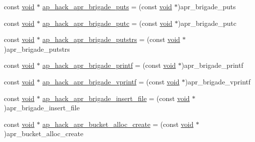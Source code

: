 \begin{DoxyCompactItemize}
\item 
const \hyperlink{group__MOD__ISAPI_gacd6cdbf73df3d9eed42fa493d9b621a6}{void} $\ast$ \hyperlink{srclib_2apr-util_2exports_8c_a33dc77f706d21a38c2c9c786d3b1bf6b}{ap\+\_\+hack\+\_\+apr\+\_\+brigade\+\_\+puts} = (const \hyperlink{group__MOD__ISAPI_gacd6cdbf73df3d9eed42fa493d9b621a6}{void} $\ast$)apr\+\_\+brigade\+\_\+puts
\item 
const \hyperlink{group__MOD__ISAPI_gacd6cdbf73df3d9eed42fa493d9b621a6}{void} $\ast$ \hyperlink{srclib_2apr-util_2exports_8c_aba1f7cddf3571811583877923c597265}{ap\+\_\+hack\+\_\+apr\+\_\+brigade\+\_\+putc} = (const \hyperlink{group__MOD__ISAPI_gacd6cdbf73df3d9eed42fa493d9b621a6}{void} $\ast$)apr\+\_\+brigade\+\_\+putc
\item 
const \hyperlink{group__MOD__ISAPI_gacd6cdbf73df3d9eed42fa493d9b621a6}{void} $\ast$ \hyperlink{srclib_2apr-util_2exports_8c_a75e5c3d2c6f4a1dfde61389d0a624201}{ap\+\_\+hack\+\_\+apr\+\_\+brigade\+\_\+putstrs} = (const \hyperlink{group__MOD__ISAPI_gacd6cdbf73df3d9eed42fa493d9b621a6}{void} $\ast$)apr\+\_\+brigade\+\_\+putstrs
\item 
const \hyperlink{group__MOD__ISAPI_gacd6cdbf73df3d9eed42fa493d9b621a6}{void} $\ast$ \hyperlink{srclib_2apr-util_2exports_8c_a5fa46f7a7ef83e36a7249d8007146868}{ap\+\_\+hack\+\_\+apr\+\_\+brigade\+\_\+printf} = (const \hyperlink{group__MOD__ISAPI_gacd6cdbf73df3d9eed42fa493d9b621a6}{void} $\ast$)apr\+\_\+brigade\+\_\+printf
\item 
const \hyperlink{group__MOD__ISAPI_gacd6cdbf73df3d9eed42fa493d9b621a6}{void} $\ast$ \hyperlink{srclib_2apr-util_2exports_8c_a115b8d58028ab5b987619fbf778f7310}{ap\+\_\+hack\+\_\+apr\+\_\+brigade\+\_\+vprintf} = (const \hyperlink{group__MOD__ISAPI_gacd6cdbf73df3d9eed42fa493d9b621a6}{void} $\ast$)apr\+\_\+brigade\+\_\+vprintf
\item 
const \hyperlink{group__MOD__ISAPI_gacd6cdbf73df3d9eed42fa493d9b621a6}{void} $\ast$ \hyperlink{srclib_2apr-util_2exports_8c_a53b00f27c4f8c38d2fe8becc243737e8}{ap\+\_\+hack\+\_\+apr\+\_\+brigade\+\_\+insert\+\_\+file} = (const \hyperlink{group__MOD__ISAPI_gacd6cdbf73df3d9eed42fa493d9b621a6}{void} $\ast$)apr\+\_\+brigade\+\_\+insert\+\_\+file
\item 
const \hyperlink{group__MOD__ISAPI_gacd6cdbf73df3d9eed42fa493d9b621a6}{void} $\ast$ \hyperlink{srclib_2apr-util_2exports_8c_abe96ed20ce1a7340312984e08325dad0}{ap\+\_\+hack\+\_\+apr\+\_\+bucket\+\_\+alloc\+\_\+create} = (const \hyperlink{group__MOD__ISAPI_gacd6cdbf73df3d9eed42fa493d9b621a6}{void} $\ast$)apr\+\_\+bucket\+\_\+alloc\+\_\+create

\end{DoxyCompactItemize}
